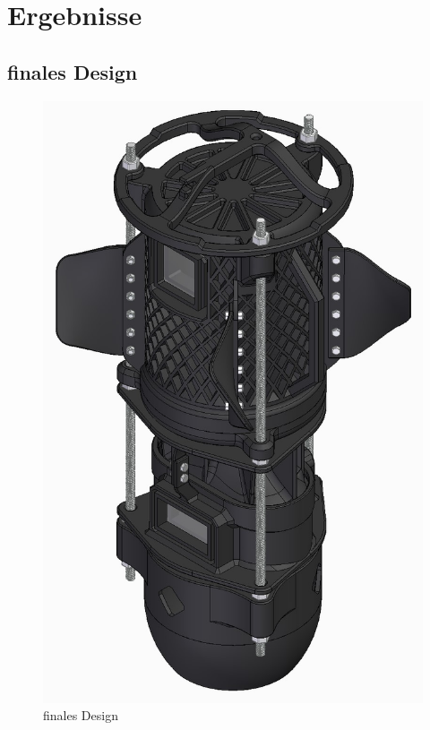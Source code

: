 \documentclass[11pt]{article}
\begin{document}
\endgroup
\newpage

\section{Ergebnisse}
\subsection{finales Design}
\begingroup
\begin{figure}
\centering
  \includegraphics[angle=-90,width=\linewidth]{finalesDesign.jpg}
  \caption{finales Design}
\end{figure}
\finalesDesign
\end{document}
